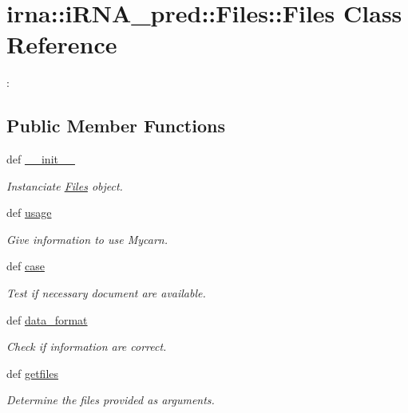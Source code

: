 \hypertarget{classirna_1_1iRNA__pred_1_1Files_1_1Files}{
\section{irna\-:\-:i\-R\-N\-A\-\_\-pred\-:\-:\-Files\-:\-:\-Files \-Class \-Reference}
\label{classirna_1_1iRNA__pred_1_1Files_1_1Files}
}


\-:  


\subsection*{\-Public \-Member \-Functions}
\begin{DoxyCompactItemize}
\item 
def \hyperlink{classirna_1_1iRNA__pred_1_1Files_1_1Files_adbec74be64129855d65561b0627a70a4}{\-\_\-\-\_\-init\-\_\-\-\_\-}
\begin{DoxyCompactList}\small\item\em \-Instanciate \hyperlink{classirna_1_1iRNA__pred_1_1Files_1_1Files}{\-Files} object. \end{DoxyCompactList}\item 
def \hyperlink{classirna_1_1iRNA__pred_1_1Files_1_1Files_ae7b67eb7f3c907dcbbf02919c04b7468}{usage}
\begin{DoxyCompactList}\small\item\em \-Give information to use \-Mycarn. \end{DoxyCompactList}\item 
def \hyperlink{classirna_1_1iRNA__pred_1_1Files_1_1Files_a251a56d17bea9558ec0d66d520449790}{case}
\begin{DoxyCompactList}\small\item\em \-Test if necessary document are available. \end{DoxyCompactList}\item 
def \hyperlink{classirna_1_1iRNA__pred_1_1Files_1_1Files_a2c285f253bbbf24c4ff13eeb5f227f84}{data\-\_\-format}
\begin{DoxyCompactList}\small\item\em \-Check if information are correct. \end{DoxyCompactList}\item 
def \hyperlink{classirna_1_1iRNA__pred_1_1Files_1_1Files_ab216a8300592c264dfe86f3d4abac10d}{getfiles}
\begin{DoxyCompactList}\small\item\em \-Determine the files provided as arguments. \end{DoxyCompactList}\end{DoxyCompactItemize}
